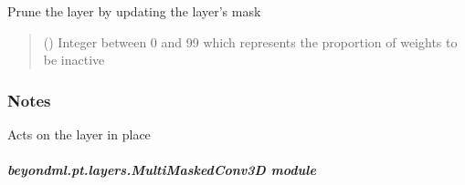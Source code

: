 \documentclass[letterpaper,10pt,english]{sphinxmanual}
\begin{document}
\begin{fulllineitems}
\begin{fulllineitems}
\label{\detokenize{beyondml.pt.layers:beyondml.pt.layers.MultiMaskedConv2D.MultiMaskedConv2D.prune}}
\pysigstartsignatures
{}
\pysigstopsignatures
\sphinxAtStartPar
Prune the layer by updating the layer’s mask
\begin{quote}\begin{description}
\sphinxAtStartPar
{} () \textendash{} Integer between 0 and 99 which represents the proportion of weights to be inactive

\end{description}\end{quote}
\subsubsection*{Notes}

\sphinxAtStartPar
Acts on the layer in place

\end{fulllineitems}


\end{fulllineitems}



\subparagraph{beyondml.pt.layers.MultiMaskedConv3D module}
\label{\detokenize{beyondml.pt.layers:module-beyondml.pt.layers.MultiMaskedConv3D}}\label{\detokenize{beyondml.pt.layers:beyondml-pt-layers-multimaskedconv3d-module}}
\end{document}
